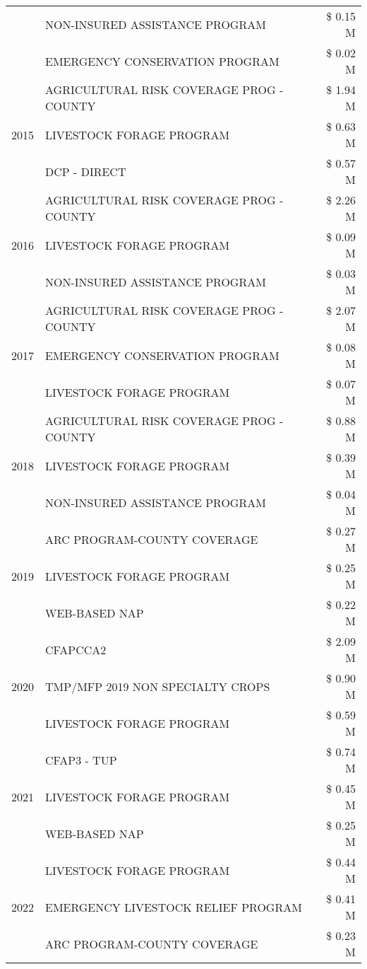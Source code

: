 \begin{tabular}{llr}
 & NON-INSURED ASSISTANCE PROGRAM & \$ 0.15 M \\
 & EMERGENCY CONSERVATION PROGRAM & \$ 0.02 M \\
\cline{1-3}
\multirow[t]{3}{*}{2015} & AGRICULTURAL RISK COVERAGE PROG - COUNTY & \$ 1.94 M \\
 & LIVESTOCK FORAGE PROGRAM & \$ 0.63 M \\
 & DCP - DIRECT & \$ 0.57 M \\
\cline{1-3}
\multirow[t]{3}{*}{2016} & AGRICULTURAL RISK COVERAGE PROG - COUNTY & \$ 2.26 M \\
 & LIVESTOCK FORAGE PROGRAM & \$ 0.09 M \\
 & NON-INSURED ASSISTANCE PROGRAM & \$ 0.03 M \\
\cline{1-3}
\multirow[t]{3}{*}{2017} & AGRICULTURAL RISK COVERAGE PROG - COUNTY & \$ 2.07 M \\
 & EMERGENCY CONSERVATION PROGRAM & \$ 0.08 M \\
 & LIVESTOCK FORAGE PROGRAM & \$ 0.07 M \\
\cline{1-3}
\multirow[t]{3}{*}{2018} & AGRICULTURAL RISK COVERAGE PROG - COUNTY & \$ 0.88 M \\
 & LIVESTOCK FORAGE PROGRAM & \$ 0.39 M \\
 & NON-INSURED ASSISTANCE PROGRAM & \$ 0.04 M \\
\cline{1-3}
\multirow[t]{3}{*}{2019} & ARC PROGRAM-COUNTY COVERAGE & \$ 0.27 M \\
 & LIVESTOCK FORAGE PROGRAM & \$ 0.25 M \\
 & WEB-BASED NAP & \$ 0.22 M \\
\cline{1-3}
\multirow[t]{3}{*}{2020} & CFAPCCA2 & \$ 2.09 M \\
 & TMP/MFP 2019 NON SPECIALTY CROPS & \$ 0.90 M \\
 & LIVESTOCK FORAGE PROGRAM & \$ 0.59 M \\
\cline{1-3}
\multirow[t]{3}{*}{2021} & CFAP3 - TUP & \$ 0.74 M \\
 & LIVESTOCK FORAGE PROGRAM & \$ 0.45 M \\
 & WEB-BASED NAP & \$ 0.25 M \\
\cline{1-3}
\multirow[t]{3}{*}{2022} & LIVESTOCK FORAGE PROGRAM & \$ 0.44 M \\
 & EMERGENCY LIVESTOCK RELIEF PROGRAM & \$ 0.41 M \\
 & ARC PROGRAM-COUNTY COVERAGE & \$ 0.23 M \\
\cline{1-3}
\bottomrule
\end{tabular}
